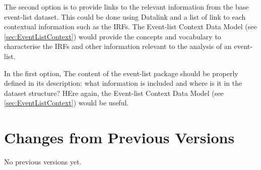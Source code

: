 \documentclass[11pt,a4paper]{ivoa}
\begin{document}
The second option is to provide links to the relevant information from the base event-list dataset. This could be done using Datalink and a list of link to each contextual information such as the IRFs. The Event-list Context Data Model (see \ref{sec:EventListContext}) would provide the concepts and vocabulary to characterise the IRFs and other information relevant to the analysis of an event-list.

In the first option, The content of the event-list package should be properly defined in its description: what information is included and where is it in the dataset structure? HEre again, the Event-list Context Data Model (see \ref{sec:EventListContext}) would be useful.








%

\appendix

\section{Changes from Previous Versions}

No previous versions yet.


\end{document}
